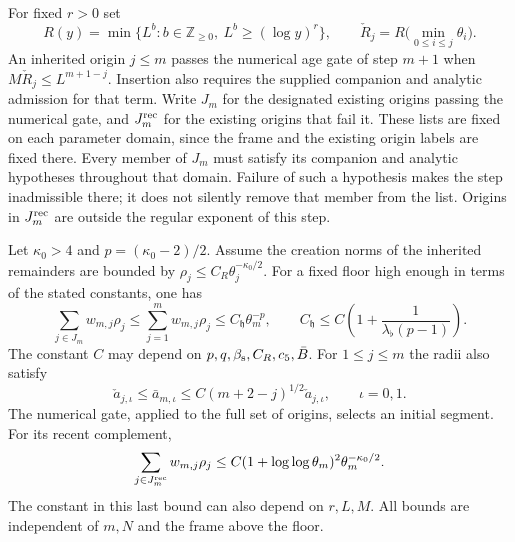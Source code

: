 \documentclass[11pt,letterpaper,reqno]{amsart}
\makeatletter
\numberwithin{equation}{section}
\theoremstyle{definition}
\newcommand{\ms@minorstart}{%
  \pushQED{\qed}\renewcommand{\qedsymbol}{$\blacksquare$}}
\newenvironment{lemma}[1][]{\ms@minorstart\ms@lemma[#1]}
  {\popQED\endms@lemma}
\theoremstyle{remark}
\makeatother
\begin{document}
For fixed $r>0$ set
\[
  R(y)=\min\{L^b:b\in\mathbb Z_{\ge0},\ L^b\ge(\log y)^r\},
  \qquad \check R_j=R\bigl(\min_{0\le i\le j}\theta_i\bigr).
\]
An inherited origin $j\le m$ passes the numerical age gate of
step $m+1$ when $M\check R_j\le L^{m+1-j}$. Insertion also
requires the supplied companion and analytic admission for that
term. Write $J_m$ for the designated existing origins passing the
numerical gate, and $J_m^{\rm rec}$ for the existing origins that
fail it. These lists are fixed on each parameter domain, since
the frame and the existing origin labels are fixed there. Every
member of $J_m$ must satisfy its companion and analytic hypotheses
throughout that domain. Failure of such a hypothesis makes the step
inadmissible there; it does not silently remove that member from
the list. Origins in $J_m^{\rm rec}$ are outside the regular exponent
of this step.

\begin{lemma}[Squared-radius loads]\label{em:lem-remainder-load}
Let $\kappa_0>4$ and $p=(\kappa_0-2)/2$. Assume the creation
norms of the inherited remainders are bounded by
$\rho_j\le C_R\theta_j^{-\kappa_0/2}$. For a fixed floor high
enough in terms of the stated constants, one has
\begin{equation}\label{em:eq-aged-load}
  \sum_{j\in J_m} w_{m,j}\rho_j
  \le \sum_{j=1}^m w_{m,j}\rho_j
  \le C_{\mathfrak h}\theta_m^{-p},\qquad
  C_{\mathfrak h}\le C\left(1+\frac{1}{\lambda_\flat(p-1)}\right).
\end{equation}
The constant $C$ may depend on $p,q,\beta_{\rm s},C_R,c_5,\bar B$.
For $1\le j\le m$ the radii also satisfy
\begin{equation}\label{em:eq-radius-nesting}
  \check a_{j,\iota}\le\bar a_{m,\iota}
       \le C(m+2-j)^{1/2}\check a_{j,\iota},\qquad \iota=0,1.
\end{equation}
The numerical gate, applied to the full set of origins, selects
an initial segment. For its recent complement,
\begin{equation}\label{em:eq-recent-load}
  \sum_{j\in J_m^{\rm rec}}w_{m,j}\rho_j
  \le C(1+\log\log\theta_m)^2\theta_m^{-\kappa_0/2}.
\end{equation}
The constant in this last bound can also depend on $r,L,M$.
All bounds are independent of $m,N$ and the frame above the floor.
\end{lemma}
\end{document}
